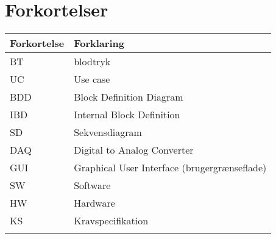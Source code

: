 \chapter{Forkortelser}

\begin{longtabu} to 
    Forkortelse &    Forklaring\\
    \toprule
    BT &    blodtryk\\
    UC	&	Use case\\
    BDD	&	Block Definition Diagram\\
    IBD	&	Internal Block Definition\\
    SD	&	Sekvensdiagram\\
    DAQ	&	Digital to Analog Converter\\
    GUI	&	Graphical User Interface (brugergrænseflade)\\
    SW	&	Software\\
    HW	&	Hardware\\
    KS	&	Kravspecifikation\\
\label{forkort}
\end{longtabu}